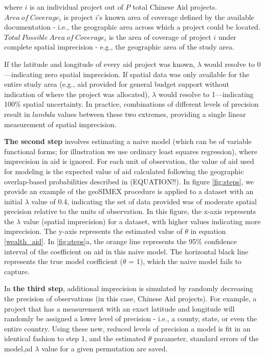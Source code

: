\documentclass[11pt]{article}
\begin{document}
\noindent where $i$ is an individual project out of $P$ total Chinese Aid projects. $Area \ of \ Coverage_i$ is project $i$'s known area of coverage defined by the available documentation - i.e., the geographic area across which a project could be located. 
$Total \ Possible \ Area \ of \ Coverage_i$ is the area of coverage of project $i$ under complete spatial imprecision - e.g., the geographic area of the study area.
\par
If the latitude and longitude of every aid project was known, $\lambda$ would resolve to 0---indicating zero spatial imprecision. 
If spatial data was only available for the entire study area (e.g., aid provided for general budget support without indication of where the project was allocated), $\lambda$ would resolve to 1---indicating 100\% spatial uncertainty. 
In practice, combinations of different levels of precision result in $lambda$ values between these two extremes, providing a single linear measurement of spatial imprecision.
\par
\textbf{The second step} involves estimating a naive model (which can be of variable functional forms; for illustration we use ordinary least squares regression), where imprecision in aid is ignored. 
For each unit of observation, the value of aid used for modeling is the expected value of aid calculated following the geographic overlap-based probabilities described in (EQUATION!!).
In figure \ref{fig:steps}, we provide an example of the geoSIMEX procedure is applied to a dataset with an initial $\lambda$ value of 0.4, indicating the set of data provided was of moderate spatial precision relative to the units of observation.
In this figure, the x-axis represents the $\lambda$ value (spatial imprecision) for a dataset, with higher values indicating more imprecision.
The y-axis represents the estimated value of $\theta$ in equation \ref{wealth_aid}.
In \ref{fig:steps}a, the orange line represents the 95\% confidence interval of the coefficient on aid in this naive model. 
The horizontal black line represents the true model coefficient ($\theta$ = 1), which the naive model fails to capture.
\par 
In \textbf{the third step}, additional imprecision is simulated by randomly decreasing the precision of observations (in this case, Chinese Aid projects). 
For example, a project that has a measurement with an exact latitude and longitude will randomly be assigned a lower level of precision - i.e., a county, state, or even the entire country. 
Using these new, reduced levels of precision a model is fit in an identical fashion to step 1, and the estimated $\theta$ parameter, standard errors of the model,ad $\lambda$ value for a given permutation are saved.
\end{document}
